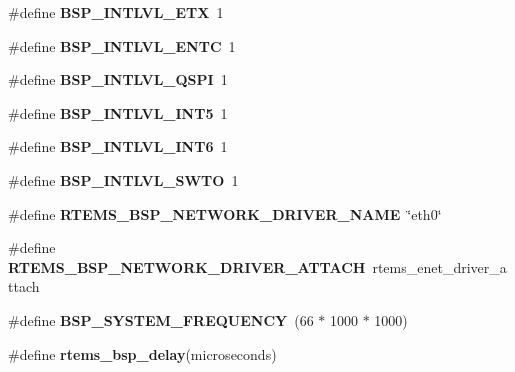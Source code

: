\begin{DoxyCompactItemize}
\#define {\bfseries B\+S\+P\+\_\+\+I\+N\+T\+L\+V\+L\+\_\+\+E\+TX}~1
\item 
\mbox{\label{group__RTEMSBSPsM68kCSB3602_ga053eb47c3eb04151d11e66878e391ec4}} 
\#define {\bfseries B\+S\+P\+\_\+\+I\+N\+T\+L\+V\+L\+\_\+\+E\+N\+TC}~1
\item 
\mbox{\label{group__RTEMSBSPsM68kCSB3602_gab7e0962cc3e3756a515c672e8128404c}} 
\#define {\bfseries B\+S\+P\+\_\+\+I\+N\+T\+L\+V\+L\+\_\+\+Q\+S\+PI}~1
\item 
\mbox{\label{group__RTEMSBSPsM68kCSB3602_gad81d229ab390f18aabe42de068b1192c}} 
\#define {\bfseries B\+S\+P\+\_\+\+I\+N\+T\+L\+V\+L\+\_\+\+I\+N\+T5}~1
\item 
\mbox{\label{group__RTEMSBSPsM68kCSB3602_gae6f15fe620c2723b0ff8ddf42fc7f3a5}} 
\#define {\bfseries B\+S\+P\+\_\+\+I\+N\+T\+L\+V\+L\+\_\+\+I\+N\+T6}~1
\item 
\mbox{\label{group__RTEMSBSPsM68kCSB3602_ga673b31e56ec5d1c27b13835a1d15a518}} 
\#define {\bfseries B\+S\+P\+\_\+\+I\+N\+T\+L\+V\+L\+\_\+\+S\+W\+TO}~1
\item 
\mbox{\label{group__RTEMSBSPsM68kCSB3602_ga86d4f9aa98431100692e31068070a8df}} 
\#define {\bfseries R\+T\+E\+M\+S\+\_\+\+B\+S\+P\+\_\+\+N\+E\+T\+W\+O\+R\+K\+\_\+\+D\+R\+I\+V\+E\+R\+\_\+\+N\+A\+ME}~\char`\"{}eth0\char`\"{}
\item 
\mbox{\label{group__RTEMSBSPsM68kCSB3602_gadde0d66aef9442971dde465292ac14e6}} 
\#define {\bfseries R\+T\+E\+M\+S\+\_\+\+B\+S\+P\+\_\+\+N\+E\+T\+W\+O\+R\+K\+\_\+\+D\+R\+I\+V\+E\+R\+\_\+\+A\+T\+T\+A\+CH}~rtems\+\_\+enet\+\_\+driver\+\_\+attach
\item 
\mbox{\label{group__RTEMSBSPsM68kCSB3602_ga365627812fa6e2775063d6e211d240ad}} 
\#define {\bfseries B\+S\+P\+\_\+\+S\+Y\+S\+T\+E\+M\+\_\+\+F\+R\+E\+Q\+U\+E\+N\+CY}~(66 $\ast$ 1000 $\ast$ 1000)
\item 
\#define {\bfseries rtems\+\_\+bsp\+\_\+delay}(microseconds)
\item 

\end{DoxyCompactItemize}
